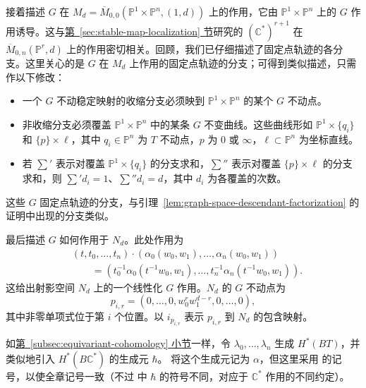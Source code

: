 接着描述 $G$ 在 $M_d=\overline M_{0,0}(\mathbb P^1\times\mathbb P^n,(1,d))$ 上的作用，它由 $\mathbb P^1\times\mathbb P^n$ 上的 $G$ 作用诱导。这与\hyperref[sec:stable-map-localization]{第~\ref*{sec:stable-map-localization} 节}研究的 $(\mathbb C^*)^{r+1}$ 在 $\overline M_{0,n}(\mathbb P^r,d)$ 上的作用密切相关。回顾，我们已仔细描述了固定点轨迹的各分支。这里关心的是 $G$ 在 $M_d$ 上作用的固定点轨迹的分支；可得到类似描述，只需作以下修改：
\begin{itemize}
\item 一个 $G$ 不动稳定映射的收缩分支必须映到 $\mathbb P^1\times\mathbb P^n$ 的某个 $G$ 不动点。
\item 非收缩分支必须覆盖 $\mathbb P^1\times\mathbb P^n$ 中的某条 $G$ 不变曲线。这些曲线形如 $\mathbb P^1\times\{q_i\}$ 和 $\{p\}\times\ell$，其中 $q_i\in\mathbb P^n$ 为 $T$ 不动点，$p$ 为 $0$ 或 $\infty$，$\ell\subset\mathbb P^n$ 为坐标直线。
\item 若 $\sum'$ 表示对覆盖 $\mathbb P^1\times\{q_i\}$ 的分支求和，$\sum''$ 表示对覆盖 $\{p\}\times\ell$ 的分支求和，则 $\sum'd_i=1$、$\sum''d_i=d$，其中 $d_i$ 为各覆盖的次数。
\end{itemize}
这些 $G$ 固定点轨迹的分支，与引理~\ref{lem:graph-space-descendant-factorization} 的证明中出现的分支类似。

最后描述 $G$ 如何作用于 $N_d$。此处作用为
\[
\begin{aligned}
&(t,t_0,\ldots,t_n)\cdot(\alpha_0(w_0,w_1),\ldots,\alpha_n(w_0,w_1))\\
&\qquad=(t_0^{-1}\alpha_0(t^{-1}w_0,w_1),\ldots,
 t_n^{-1}\alpha_n(t^{-1}w_0,w_1)).
\end{aligned}
\]
这给出射影空间 $N_d$ 上的一个线性化 $G$ 作用。$N_d$ 的 $G$ 不动点为
\[
p_{i,r}=(0,\ldots,0,w_0^rw_1^{d-r},0,\ldots,0),
\]
其中非零单项式位于第 $i$ 个位置。以 $i_{p_{i,r}}$ 表示 $p_{i,r}$ 到 $N_d$ 的包含映射。

如\hyperref[subsec:equivariant-cohomology]{第~\ref*{subsec:equivariant-cohomology} 小节}一样，令 $\lambda_0,\ldots,\lambda_n$ 生成 $H^*(BT)$，并类似地引入 $H^*(B\mathbb C^*)$ 的生成元 $\hbar$。 将这个生成元记为 $\alpha$，但这里采用  的记号，以使全章记号一致（不过  中 $\hbar$ 的符号不同，对应于 $\mathbb C^*$ 作用的不同约定）。

